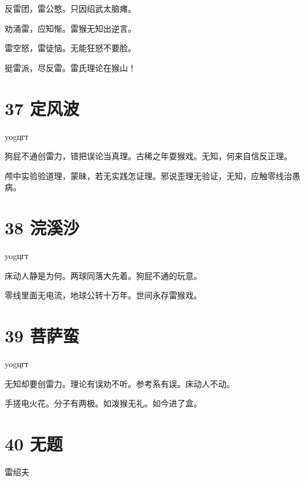 \documentclass[UTF8,12pt,oneside]{ctexbook}
\begin{document}
        \begin{center}
            反雷团，雷公憨。只因绍武太脑瘫。
            
            劝涌雷，应知惭。雷猴无知出逆言。
            
            雷空怒，雷徒恼。无能狂怒不要脸。
            
            挺雷派，尽反雷。雷氏理论在猴山！
        \end{center}
        
        \newpage
        
        \section{37 定风波}
        \begin{center}
            yogцгт
        \end{center}
        
        狗屁不通创雷力，错把误论当真理。古稀之年耍猴戏。无知，何来自信反正理。
        
        颅中实验验道理，蒙昧，若无实践怎证理。邪说歪理无验证，无知，应触零线治愚病。
        ~\\
        
        \section{38 浣溪沙}
        \begin{center}
            yogцгт
        \end{center}
        
        床动人静是为何。两球同落大先着。狗屁不通的玩意。
        
        零线里面无电流，地球公转十万年。世间永存雷猴戏。
        ~\\
        
        \section{39 菩萨蛮}
        \begin{center}
            yogцгт
        \end{center}
        
        无知却要创雷力。理论有误劝不听。参考系有误。床动人不动。
        
        手搓电火花。分子有两极。如泼猴无礼。如今进了盒。
        
        \newpage
        
        \section{40 无题}
        \begin{center}
            雷绍夫
        \end{center}
        
\end{document}
